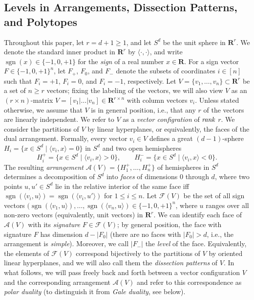 \documentclass[11pt]{article}
\newcommand{\arr}{\mathcal{A}}
\DeclareMathOperator{\sgn}{sgn}
\renewcommand{\leq}{\leqslant}
\renewcommand{\geq}{\geqslant}
\newcommand{\R}{\mathbf{R}}
\begin{document}
\subsection{Levels in Arrangements, Dissection Patterns, and Polytopes}
\label{sec:arrangments}
Throughout this paper, let $r=d+1 \geq 1$, and let $S^d$ be the unit sphere in $\R^r$. We denote the standard inner product in $\R^r$ by $\langle\cdot ,\cdot \rangle$, and write $\sgn(x)\in \{-1,0,+1\}$ for the \emph{sign} of a real number 
$x\in \R$. %
For a sign vector $F\in \{-1,0,+1\}^n$, let $F_+$, $F_0$, and $F_-$ denote the subsets of coordinates $i\in [n]$ such that $F_i=+1$, $F_i=0$, and $F_i=-1$, respectively.
%
Let $V = \{ v_1, \ldots, v_n \} \subset \R^r$ be a set of $n\geq r$ vectors; fixing the labeling of the vectors, we will also view $V$ as an $(r\times n)$-matrix $V=[v_1|\dots|v_n] \in \R^{r\times n}$ with column vectors $v_i$. Unless stated otherwise, we assume that $V$ is in general position, i.e., that any $r$ of the vectors are linearly independent. We refer to $V$ as a \emph{vector configration} of $\emph{rank}$ $r$. 
%
We consider the partitions of $V$ by linear hyperplanes, or equivalently, the faces of the dual arrangement. Formally, every vector $v_i \in V$ defines a great $(d-1)$-sphere
$
H_i = \{ x \in S^d \mid \langle v_i, x \rangle = 0 \}
$
in $S^d$ and two open hemispheres
$$
H_i^+ = \{ x \in S^d \mid \langle v_i, x \rangle >0 \}, \qquad H_i^- = \{ x \in S^d \mid \langle v_i, x \rangle < 0 \}.
$$
The resulting \emph{arrangement} $\arr(V)=\{H_1^+,\dots,H_n^+\}$ of hemispheres in $S^d$ determines a decomposition of $S^d$ into \emph{faces} of dimensions $0$ through $d$, where two points $u,u'\in S^d$ lie in the relative interior of the same face iff $\sgn(\langle v_i,u \rangle)=\sgn(\langle v_i,u'\rangle)$ for $1\leq i\leq n$. Let $\mathcal{F}(V)$ be the set of all sign vectors $(\sgn(\langle v_1,u\rangle),\dots,\sgn(\langle v_n,u\rangle) \in \{-1,0,+1\}^n$, where $u$ ranges over all non-zero vectors (equivalently, unit vectors) in $\R^r$. We can identify each face of $\arr(V)$ with its \emph{signature} $F\in \mathcal{F}(V)$; by general position, the face with signature $F$ has dimension $d-|F_0|$ (there are no faces with $|F_0|>d$, i.e., the arrangement is \emph{simple}). Moreover, we call $|F_-|$ the \emph{level} of the face. Equivalently, the elements of $\mathcal{F}(V)$ correspond bijectively to the partitions of $V$ by oriented linear hyperplanes, and we will also call them the \emph{dissection patterns} of $V$. In what follows, we will pass freely back and forth between a vector configuration $V$ and the corresponding arrangement $\mathcal{A}(V)$ and refer to this correspondence as \emph{polar duality} (to distinguish it from \emph{Gale duality}, see below).
\end{document}
